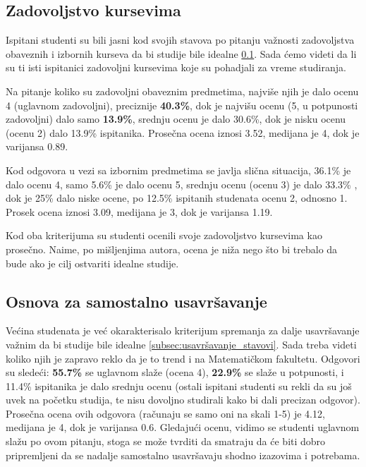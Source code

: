 \documentclass[a4paper]{article}
\begin{document}
{\subsection{Zadovoljstvo kursevima}
\label{subsec:zadovoljstvo_iskustva}
Ispitani studenti su bili jasni kod svojih stavova po pitanju važnosti zadovoljstva obaveznih i izbornih kurseva da bi studije bile idealne \ref{subsec:zadovoljstvo_iskustva}. Sada ćemo videti da li su ti isti ispitanici zadovoljni kursevima koje su pohadjali za vreme studiranja.

Na pitanje koliko su zadovoljni obaveznim predmetima, najviše njih je dalo ocenu 4 (uglavnom zadovoljni), preciznije \textbf{40.3\%}, dok je najvišu ocenu (5, u potpunosti zadovoljni) dalo samo \textbf{13.9\%}, srednju ocenu je dalo 30.6\%, dok je nisku ocenu (ocenu 2) dalo 13.9\% ispitanika. Prosečna ocena iznosi 3.52, medijana je 4, dok je varijansa 0.89.

Kod odgovora u vezi sa izbornim predmetima se javlja slična situacija, 36.1\% je dalo ocenu 4, samo 5.6\% je dalo ocenu 5, srednju ocenu (ocenu 3) je dalo 33.3\% , dok je 25\% dalo niske ocene, po 12.5\% ispitanih studenata ocenu 2, odnosno 1. Prosek ocena iznosi 3.09, medijana je 3, dok je varijansa 1.19. 

Kod oba kriterijuma su studenti ocenili svoje zadovoljstvo kursevima kao prosečno. Naime, po mišljenjima autora, ocena je niža nego što bi trebalo da bude ako je cilj ostvariti idealne studije.

\subsection{Osnova za samostalno usavršavanje}
\label{subsec:usavršavanje_iskustva}
Većina studenata je već okarakterisalo kriterijum spremanja za dalje usavršavanje važnim da bi studije bile idealne \ref{subsec:usavršavanje_stavovi}. Sada treba videti koliko njih je zapravo reklo da je to trend i na Matematičkom fakultetu.
Odgovori su sledeći: \textbf{55.7\%} se uglavnom slaže (ocena 4), \textbf{22.9\%} se slaže u potpunosti, i 11.4\% ispitanika je dalo srednju ocenu (ostali ispitani studenti su rekli da su još uvek na početku studija, te nisu dovoljno studirali kako bi dali precizan odgovor). Prosečna ocena ovih odgovora (računaju se samo oni na skali 1-5) je  4.12, medijana je 4, dok je varijansa 0.6. Gledajući ocenu, vidimo se studenti uglavnom slažu po ovom pitanju, stoga se može tvrditi da smatraju da će biti dobro pripremljeni da se nadalje samostalno usavršavaju shodno izazovima i potrebama.


}
\end{document}

